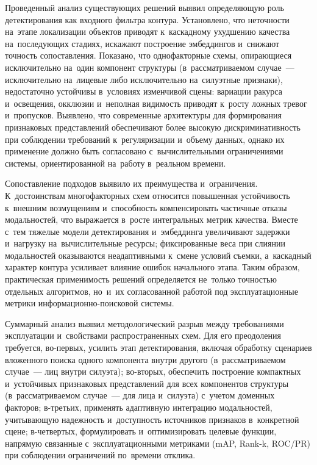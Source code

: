 Проведенный анализ существующих решений выявил определяющую роль
детектирования как входного фильтра контура. Установлено, что неточности
на~этапе локализации объектов приводят к~каскадному ухудшению качества
на~последующих стадиях, искажают построение эмбеддингов и~снижают
точность сопоставления. Показано, что однофакторные схемы, опирающиеся
исключительно на~один компонент структуры (в~рассматриваемом случае~--- исключительно на~лицевые либо исключительно на~силуэтные признаки),
недостаточно устойчивы в~условиях изменчивой сцены: вариации ракурса
и~освещения, окклюзии и~неполная видимость приводят к~росту ложных
тревог и~пропусков. Выявлено, что современные архитектуры для
формирования признаковых представлений обеспечивают более высокую
дискриминативность при соблюдении требований к~регуляризации и~объему
данных, однако их применение должно быть согласовано с~вычислительными
ограничениями системы, ориентированной на~работу в~реальном времени.

Сопоставление подходов выявило их преимущества
и~ограничения. К~достоинствам многофакторных схем относится повышенная
устойчивость к~внешним возмущениям и~способность компенсировать
частичные отказы модальностей, что выражается в~росте интегральных
метрик качества. Вместе с~тем тяжелые модели детектирования
и~эмбеддинга увеличивают задержки и~нагрузку на~вычислительные ресурсы;
фиксированные веса при слиянии модальностей оказываются неадаптивными
к~смене условий съемки, а~каскадный характер контура усиливает влияние
ошибок начального этапа. Таким образом, практическая применимость
решений определяется не~только точностью отдельных алгоритмов, но~и~их
согласованной работой под эксплуатационные метрики
информационно-поисковой системы.

Суммарный анализ выявил методологический разрыв между требованиями
эксплуатации и~свойствами распространенных схем. Для его преодоления
требуется, во-первых, усилить этап детектирования, включая обработку
сценариев вложенного поиска одного компонента внутри другого (в~рассматриваемом случае~--- лиц внутри силуэта); во-вторых, обеспечить
построение компактных и~устойчивых признаковых представлений для всех компонентов структуры (в~рассматриваемом случае~--- для лица
и~силуэта) с~учетом доменных факторов; в-третьих, применять адаптивную
интеграцию модальностей, учитывающую надежность и~доступность
источников признаков в~конкретной сцене; в-четвертых, формулировать
и~оптимизировать целевые функции, напрямую связанные с~эксплуатационными
метриками (mAP, Rank-k, ROC/PR) при соблюдении ограничений по~времени
отклика.

